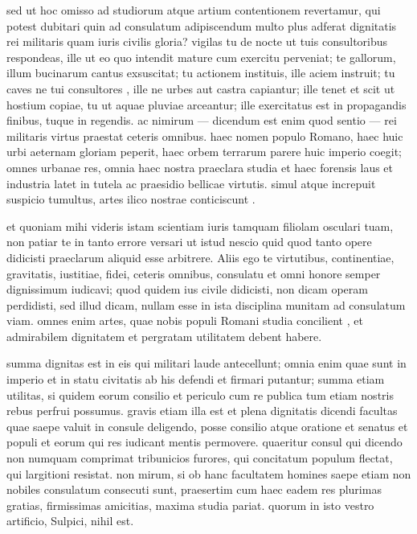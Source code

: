  sed ut hoc omisso ad studiorum atque artium contentionem revertamur, qui potest dubitari quin ad consulatum adipiscendum multo plus adferat dignitatis rei militaris quam iuris civilis gloria? vigilas tu de nocte ut tuis consultoribus respondeas, ille ut eo quo intendit mature cum exercitu perveniat; te gallorum, illum bucinarum cantus exsuscitat; tu actionem instituis, ille aciem instruit; tu caves ne tui consultores , ille ne urbes aut castra capiantur; ille tenet et scit ut hostium copiae, tu ut aquae pluviae arceantur; ille exercitatus est in propagandis finibus, tuque in regendis. ac nimirum — dicendum est enim quod sentio — rei militaris virtus praestat ceteris omnibus. haec nomen populo Romano, haec huic urbi aeternam gloriam peperit, haec orbem terrarum parere huic imperio coegit; omnes urbanae res, omnia haec nostra praeclara studia et haec forensis laus et industria latet in tutela ac praesidio bellicae virtutis. simul atque increpuit suspicio tumultus, artes ilico nostrae conticiscunt .

 et quoniam mihi videris istam scientiam iuris tamquam filiolam osculari tuam, non patiar te in tanto errore versari ut istud nescio quid quod tanto opere didicisti praeclarum aliquid esse arbitrere. Aliis ego te virtutibus, continentiae, gravitatis, iustitiae, fidei, ceteris omnibus, consulatu et omni honore semper dignissimum iudicavi; quod quidem ius civile didicisti, non dicam operam perdidisti, sed illud dicam, nullam esse in ista disciplina munitam ad consulatum viam. omnes enim artes, quae nobis populi Romani studia concilient , et admirabilem dignitatem et pergratam utilitatem debent habere.

 summa dignitas est in eis qui militari laude antecellunt; omnia enim quae sunt in imperio et in statu civitatis ab his defendi et firmari putantur; summa etiam utilitas, si quidem eorum consilio et periculo cum re publica tum etiam nostris rebus perfrui possumus. gravis etiam illa est et plena dignitatis dicendi facultas quae saepe valuit in consule deligendo, posse consilio atque oratione et senatus et populi et eorum qui res iudicant mentis permovere. quaeritur consul qui dicendo non numquam comprimat tribunicios furores, qui concitatum populum flectat, qui largitioni resistat. non mirum, si ob hanc facultatem homines saepe etiam non nobiles consulatum consecuti sunt, praesertim cum haec eadem res plurimas gratias, firmissimas amicitias, maxima studia pariat. quorum in isto vestro artificio, Sulpici, nihil est.


